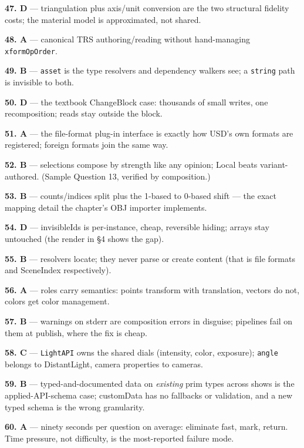 \noindent\textbf{47. D} --- triangulation plus axis/unit conversion are the
two structural fidelity costs; the material model is approximated, not
shared.

\noindent\textbf{48. A} --- canonical TRS authoring/reading without
hand-managing \texttt{xformOpOrder}.

\noindent\textbf{49. B} --- \texttt{asset} is the type resolvers and
dependency walkers see; a \texttt{string} path is invisible to both.

\noindent\textbf{50. D} --- the textbook ChangeBlock case: thousands of
small writes, one recomposition; reads stay outside the block.

\noindent\textbf{51. A} --- the file-format plug-in interface is exactly how
USD's own formats are registered; foreign formats join the same way.

\noindent\textbf{52. B} --- selections compose by strength like any opinion;
Local beats variant-authored. (Sample Question 13, verified by
composition.)

\noindent\textbf{53. B} --- counts/indices split plus the 1-based to
0-based shift --- the exact mapping detail the chapter's OBJ importer
implements.

\noindent\textbf{54. D} --- invisibleIds is per-instance, cheap, reversible
hiding; arrays stay untouched (the render in \S4 shows the gap).

\noindent\textbf{55. B} --- resolvers locate; they never parse or create
content (that is file formats and SceneIndex respectively).

\noindent\textbf{56. A} --- roles carry semantics: points transform with
translation, vectors do not, colors get color management.

\noindent\textbf{57. B} --- warnings on stderr are composition errors in
disguise; pipelines fail on them at publish, where the fix is cheap.

\noindent\textbf{58. C} --- \texttt{LightAPI} owns the shared dials
(intensity, color, exposure); \texttt{angle} belongs to DistantLight,
camera properties to cameras.

\noindent\textbf{59. B} --- typed-and-documented data on \emph{existing}
prim types across shows is the applied-API-schema case; customData has no
fallbacks or validation, and a new typed schema is the wrong granularity.

\noindent\textbf{60. A} --- ninety seconds per question on average:
eliminate fast, mark, return. Time pressure, not difficulty, is the
most-reported failure mode.

